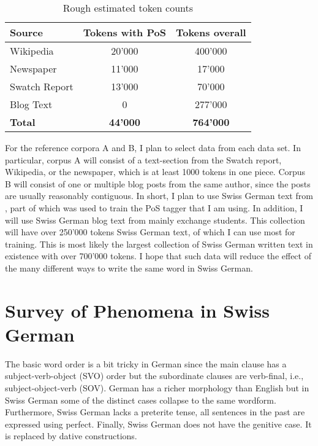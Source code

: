 \documentclass[11pt,letterpaper, covington]{article}
\begin{document}
\begin{table}
\center
\begin{tabular}{ | l | c | c | }
   \hline
   \textbf{Source} & \textbf{Tokens with PoS} & \textbf{Tokens overall} \\ \hline
   Wikipedia & 20'000 & 400'000 \\
   Newspaper & 11'000 & 17'000 \\ 
   Swatch Report & 13'000 & 70'000 \\
   Blog Text & 0 & 277'000 \\ \hline
   \textbf{Total} & \textbf{44'000} & \textbf{764'000} \\ \hline
\end{tabular}
\caption{Rough estimated token counts}
\end{table}

For the reference corpora A and B, I plan to select data from each data set. In particular, corpus A will consist of a text-section from the Swatch report, Wikipedia, or the newspaper, which is at least 1000 tokens in one piece. Corpus B will consist of one or multiple blog posts from the same author, since the posts are usually reasonably contiguous. In short, I plan to use Swiss German text from \cite{AH14}, part of which was used to train the PoS tagger that I am using. In addition, I will use Swiss German blog text from mainly exchange students. This collection will have over 250'000 tokens Swiss German text, of which I can use most for training. This is most likely the largest collection of Swiss German written text in existence with over 700'000 tokens. I hope that such data will reduce the effect of the many different ways to write the same word in Swiss German.

\section{Survey of Phenomena in Swiss German}

The basic word order is a bit tricky in German since the main clause has a subject-verb-object (SVO) order but the subordinate clauses are verb-final, i.e., subject-object-verb (SOV). German has a richer morphology than English but in Swiss German some of the distinct cases collapse to the same wordform. Furthermore, Swiss German lacks a preterite tense, all sentences in the past are expressed using perfect. Finally, Swiss German does not have the genitive case. It is replaced by dative constructions. \citep{Scherrer11}
\end{document}
